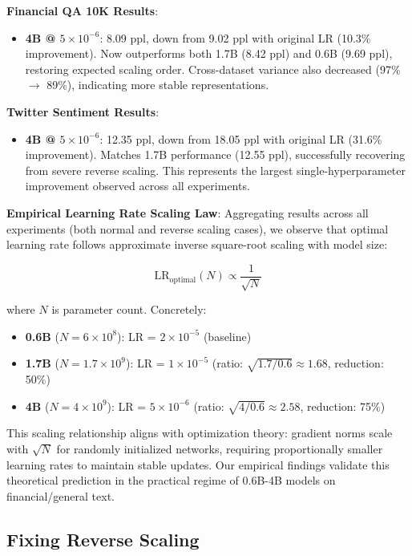 \textbf{Financial QA 10K Results}:
\begin{itemize}
\item \textbf{4B @ $5 \times 10^{-6}$}: 8.09 ppl, down from 9.02 ppl with original LR (10.3\% improvement). Now outperforms both 1.7B (8.42 ppl) and 0.6B (9.69 ppl), restoring expected scaling order. Cross-dataset variance also decreased (97\% $\to$ 89\%), indicating more stable representations.
\end{itemize}

\textbf{Twitter Sentiment Results}:
\begin{itemize}
\item \textbf{4B @ $5 \times 10^{-6}$}: 12.35 ppl, down from 18.05 ppl with original LR (31.6\% improvement). Matches 1.7B performance (12.55 ppl), successfully recovering from severe reverse scaling. This represents the largest single-hyperparameter improvement observed across all experiments.
\end{itemize}

\textbf{Empirical Learning Rate Scaling Law}: Aggregating results across all experiments (both normal and reverse scaling cases), we observe that optimal learning rate follows approximate inverse square-root scaling with model size:

\[
\text{LR}_{\text{optimal}}(N) \propto \frac{1}{\sqrt{N}}
\]

where $N$ is parameter count. Concretely:
\begin{itemize}
\item \textbf{0.6B} ($N = 6 \times 10^8$): LR = $2 \times 10^{-5}$ (baseline)
\item \textbf{1.7B} ($N = 1.7 \times 10^9$): LR = $1 \times 10^{-5}$ (ratio: $\sqrt{1.7/0.6} \approx 1.68$, reduction: 50\%)
\item \textbf{4B} ($N = 4 \times 10^9$): LR = $5 \times 10^{-6}$ (ratio: $\sqrt{4/0.6} \approx 2.58$, reduction: 75\%)
\end{itemize}

This scaling relationship aligns with optimization theory: gradient norms scale with $\sqrt{N}$ for randomly initialized networks, requiring proportionally smaller learning rates to maintain stable updates. Our empirical findings validate this theoretical prediction in the practical regime of 0.6B-4B models on financial/general text.

\subsection{Fixing Reverse Scaling}

